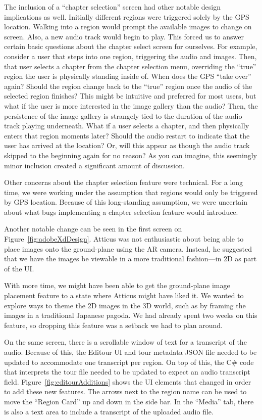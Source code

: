 \documentclass[a4paper, 10pt, american, titlepage]{article}
\begin{document}
The inclusion of a ``chapter selection'' screen had other notable design
implications as well. Initially different regions were triggered solely by the
GPS location. Walking into a region would prompt the available images to change
on screen. Also, a new audio track would begin to play. This forced us to
answer certain basic questions about the chapter select screen for ourselves.
For example, consider a user that steps into one region, triggering the audio
and images. Then, that user selects a chapter from the chapter selection menu,
overriding the ``true'' region the user is physically standing inside of. When
does the GPS ``take over'' again? Should the region change back to the ``true''
region once the audio of the selected region finishes? This might be intuitive
and preferred for most users, but what if the user is more interested in the
image gallery than the audio? Then, the persistence of the image gallery is
strangely tied to the duration of the audio track playing underneath. What if a
user selects a chapter, and then physically enters that region moments later?
Should the audio restart to indicate that the user has arrived at the location?
Or, will this appear as though the audio track skipped to the beginning again
for no reason? As you can imagine, this seemingly minor inclusion created a
significant amount of discussion.

Other concerns about the chapter selection feature were technical. For a long
time, we were working under the assumption that regions would only be triggered
by GPS location. Because of this long-standing assumption, we were uncertain
about what bugs implementing a chapter selection feature would introduce.

Another notable change can be seen in the first screen on
Figure~\ref{fig:adobeXdDesign}. Atticus was not enthusiastic about being able
to place images onto the ground-plane using the AR camera. Instead, he
suggested that we have the images be viewable in a more traditional
fashion---in 2D as part of the UI.

With more time, we might have been able to get the ground-plane image placement
feature to a state where Atticus might have liked it. We wanted to explore ways
to theme the 2D images in the 3D world, such as by framing the images in a
traditional Japanese pagoda. We had already spent two weeks on this feature, so
dropping this feature was a setback we had to plan around.

On the same screen, there is a scrollable window of text for a transcript of
the audio. Because of this, the Editour UI and tour metadata JSON file needed
to be updated to accommodate one transcript per region. On top of this, the C\#
code that interprets the tour file needed to be updated to expect an audio
transcript field.  Figure~\ref{fig:editourAdditions} shows the UI elements that
changed in order to add these new features. The arrows next to the region name
can be used to move the ``Region Card'' up and down in the side bar. In the
``Media'' tab, there is also a text area to include a transcript of the
uploaded audio file.
\end{document}
